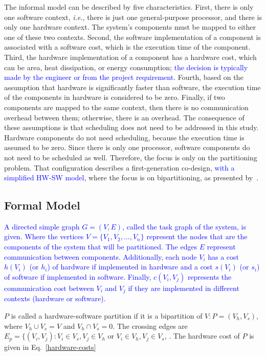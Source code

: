 \documentclass{doublecol-new}
\theoremstyle{TH}{
\newtheorem{lemma}{Lemma}
\newtheorem{theorem}[lemma]{Theorem}
\newtheorem{corrolary}[lemma]{Corrolary}
\newtheorem{conjecture}[lemma]{Conjecture}
\newtheorem{proposition}[lemma]{Proposition}
\newtheorem{claim}[lemma]{Claim}
\newtheorem{stheorem}[lemma]{Wrong Theorem}
\newtheorem{algorithm}{Algorithm}
}
\theoremstyle{THrm}{
\newtheorem{definition}{Definition}[section]
\newtheorem{question}{Question}[section]
\newtheorem{remark}{Remark}
\newtheorem{scheme}{Scheme}
}
\theoremstyle{THhit}{
\newtheorem{case}{Case}[section]
}
\begin{document}
The informal model can be described by five characteristics. First, there is only one software context, {\it i.e.}, there is just one general-purpose processor, and there is only one hardware context. The system's components must be mapped to either one of these two contexts. Second, the software implementation of a component is associated with a software cost, which is the execution time of the component. Third, the hardware implementation of a component has a hardware cost, which can be area, heat dissipation, or energy consumption; \textcolor{blue}{the decision is typically made by the engineer or from the project requirement.} Fourth, based on the assumption that hardware is significantly faster than software, the execution time of the components in hardware is considered to be zero. Finally, if two components are mapped to the same context, then there is no communication overhead between them; otherwise, there is an overhead. The consequence of these assumptions is that scheduling does not need to be addressed in this study. Hardware components do not need scheduling, because the execution time is assumed to be zero. Since there is only one processor, software components do not need to be scheduled as well. Therefore, the focus is only on the partitioning problem. That configuration describes a first-generation co-design, \textcolor{blue}{with a simplified HW-SW model,} where the focus is on bipartitioning, as presented by~\cite{Teich2012}.

\subsection{Formal Model}
\label{Formal-Model}

\textcolor{blue}{A directed simple graph $ G = (V,E) $, called the task graph of the system, is given. Where the vertices $V = \{V_1,V_2,\dotso,V_n\}$ represent the nodes that are the components of the system that will be partitioned. The edges $E$ represent communication between components. Additionally, each node  $V_i$ has a cost $h(V_i)$ (or $h_i$) of hardware if implemented in hardware and a cost $s(V_i)$ (or $ s_i $) of software if implemented in software. Finally, $c(V_i,V_j)$ represents the communication cost between $V_i$ and $V_j$ if they are implemented in different contexts (hardware or software).}

$P$ is called a hardware-software partition if it is a bipartition of $V:P = (V_h, V_s)$, where $V_h \cup V_s = V$  and $V_h \cap V_s = 0$. The crossing edges are $E_p = \{(V_i,V_j):V_i \in V_s, V_j \in V_h$ or $V_i \in V_h, V_j \in V_s $, \cite{Arato2003}. The hardware cost of $P$ is given in Eq.~\eqref{hardware-costs}
\end{document}
